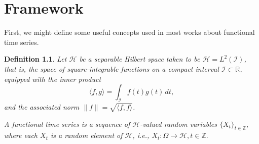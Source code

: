 \documentclass[
	12pt,				%
	oneside,			%
	a4paper,			%
	english,			%
	brazil				%
	]{abntex2ppgsi}
\newtheorem{definition}{Definition}
\begin{document}








\chapter{Framework}

First, we might define some useful concepts used in most works about functional time series. 

\begin{definition}
Let $\mathcal{H}$ be a separable Hilbert space taken to be $\mathcal{H} = L^2(\mathcal{I})$, that is, the space of square-integrable functions on a compact interval $\mathcal{I} \subset \mathbb{R}$, equipped with the inner product
\begin{equation}
\langle f, g \rangle = \int_{\mathcal{I}} f(t) g(t) \, dt,
\end{equation}
and the associated norm $\|f\| = \sqrt{\langle f, f \rangle}$.

A \emph{functional time series} is a sequence of $\mathcal{H}$-valued random variables $\{X_t\}_{t \in \mathbb{Z}}$, where each $X_t$ is a random element of $\mathcal{H}$, i.e., $X_t : \Omega \to \mathcal{H}, t \in \mathbb{Z}.$

\end{definition}
\end{document}
